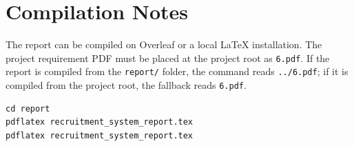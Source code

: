 \documentclass[12pt,a4paper]{report}
\begin{document}
\chapter{Compilation Notes}

The report can be compiled on Overleaf or a local \LaTeX{} installation. The project requirement PDF must be placed at the project root as \texttt{6.pdf}. If the report is compiled from the \texttt{report/} folder, the command reads \texttt{../6.pdf}; if it is compiled from the project root, the fallback reads \texttt{6.pdf}.

\begin{lstlisting}[caption={Example local compilation command}]
cd report
pdflatex recruitment_system_report.tex
pdflatex recruitment_system_report.tex
\end{lstlisting}
\end{document}
